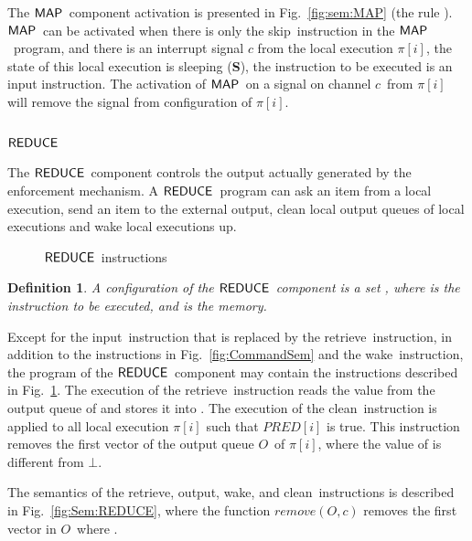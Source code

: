 \documentclass[10pt,a4paper,oneside]{article}
\newtheorem{definition}{Definition}[section]
\def\remove#1#2{\ensuremath{remove(#1,#2)}}
\def\intsig#1{\ensuremath{#1}}
\def\sS{\textbf{S}}
\def\chnl{\ensuremath{c}}
\def\NIL{\ensuremath{\bot}}
\def\sanserif#1{\ensuremath{\sf #1}}
\def\REDUCE{\ensuremath{\sanserif{REDUCE}}}
\def\MAP{\ensuremath{\sanserif{MAP}}}
\def\Prog{\ensuremath{\pi}}
\def\Progl#1{\ensuremath{\Prog[#1]}}
\def\Oid{\ensuremath{O}}
\def\NSKIP{skip}
\def\NINPUT{input}
\def\NOUTPUT{output}
\def\NWAKE{wake}
\def\NINPUTR{retrieve}
\def\NCLEAN{clean}
\def\NPRED{\ensuremath{PRED}}
\def\PREDE#1{\ensuremath{\NPRED[#1]}}
\begin{document}
The \MAP\ component activation is presented in Fig.~\ref{fig:sem:MAP} (the rule ). \MAP\ can be activated when there is only the \NSKIP\ instruction in the \MAP\ program, and there is an interrupt signal  \intsig{\chnl} from the local execution \Progl{i}, the state of this local execution is sleeping (\sS), the instruction to be executed is an input instruction.  The activation of \MAP\  on a signal on channel \chnl\ from \Progl{i} will remove the signal from configuration of \Progl{i}.


\subsection{\REDUCE} \label{sec:emp:reduce}
The \REDUCE\ component controls the output actually generated by the enforcement mechanism. A \REDUCE\ program  can ask an item from a local execution, send an item to the external output, clean local output queues of local executions and wake local executions up.

\begin{figure}
\centering
	
\caption{\REDUCE\ instructions}
\label{fig:comm:REDUCE}
\end{figure}

\begin{definition}\label{def:execConf:REDUCE}
A configuration of the \REDUCE\ component is a set , where  is the instruction to be executed, and  is the memory.
\end{definition}

Except for the \NINPUT\ instruction that is replaced by the \NINPUTR\ instruction, in addition to the instructions in Fig.~\ref{fig:CommandSem} and the \NWAKE\ instruction, the program of the \REDUCE\ component may contain the instructions described in Fig.~\ref{fig:comm:REDUCE}. The execution of the \NINPUTR\ instruction reads the value from the output queue of  and stores it into . The execution of the \NCLEAN\ instruction is applied to all local execution \Progl{i} such that \PREDE{i} is true. This instruction removes the first vector  of the output queue \Oid\ of \Progl{i}, where the value of  is different from \NIL.

The semantics of the \NINPUTR, \NOUTPUT, \NWAKE, and \NCLEAN\ instructions is described in Fig.~\ref{fig:Sem:REDUCE}, where the function \remove{\Oid}{\chnl} removes the first vector  in \Oid\ where .
\end{document}
